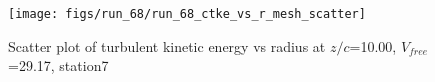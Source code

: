 \begin{figure}[H]
\centering
\texttt{[image: figs/run\_68/run\_68\_ctke\_vs\_r\_mesh\_scatter]}
\caption{Scatter plot of turbulent kinetic energy vs radius at $z/c$=10.00, $V_{free}$=29.17, station7}
\label{fig:run_68_ctke_vs_r_mesh_scatter}
\end{figure}


